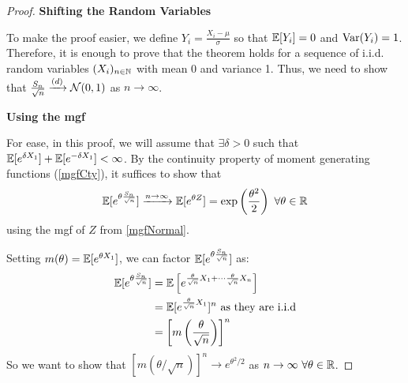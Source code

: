 \documentclass[../main.tex]{subfiles}
\begin{document}
\begin{proof}\par
  \textbf{Shifting the Random Variables}\par
  To make the proof easier, we define $Y_i = \frac{X_i - \mu}{\sigma}$ so that $\mathbb{E}[Y_i] = 0$ and $\operatorname{Var}(Y_i) = 1$.
  Therefore, it is enough to prove that the theorem holds for a sequence of i.i.d. random variables $(X_i)_{n \in \mathbb{N}}$ with mean 0 and variance 1.
  Thus, we need to show that $\frac{S_n}{\sqrt{n}} \xrightarrow{(d)} \operatorname{\mathcal{N}}(0, 1)$ as $n \to \infty$.

  \textbf{Using the mgf}\par
  For ease, in this proof, we  will assume that $\exists \delta > 0$ such that $\mathbb{E}[e^{\delta X_1}] + \mathbb{E}[e^{-\delta X_1}] < \infty$.
  By the continuity property of moment generating functions (\cref{mgfCty}), it suffices to show that
  \[
    \mathbb{E}[e^{\theta \frac{S_n}{\sqrt{n}}}] \xrightarrow{n\to \infty} \mathbb{E}[e^{\theta Z}] = \exp\left(\frac{\theta^2}{2}\right)\ \forall \theta \in \mathbb{R}
  \]
  using the mgf of $Z$ from \cref{mgfNormal}.

  Setting $m(\theta) = \mathbb{E}[e^{\theta X_1}]$, we can factor $\mathbb{E}[e^{\theta \frac{S_n}{\sqrt{n}}}]$ as:
  \begin{align*}
    \mathbb{E}[e^{\theta \frac{S_n}{\sqrt{n}}}] &= \mathbb{E}\left[e^{\frac{\theta}{\sqrt{n}}X_1 + \cdots \frac{\theta}{\sqrt{n}}X_n}\right] \\
                                        &= \mathbb{E}[e^{\frac{\theta}{\sqrt{n}}X_1}]^{n} \text{ as they are i.i.d} \\
                                        &= \left[m\left(\frac{\theta}{\sqrt{n}}\right)\right]^{n}
  \end{align*}
  So we want to show that $[m(\theta/\sqrt{n})]^{n} \to e^{\theta^2/2}$ as $n \to \infty\ \forall \theta \in \mathbb{R}$.


\end{proof}
\end{document}
